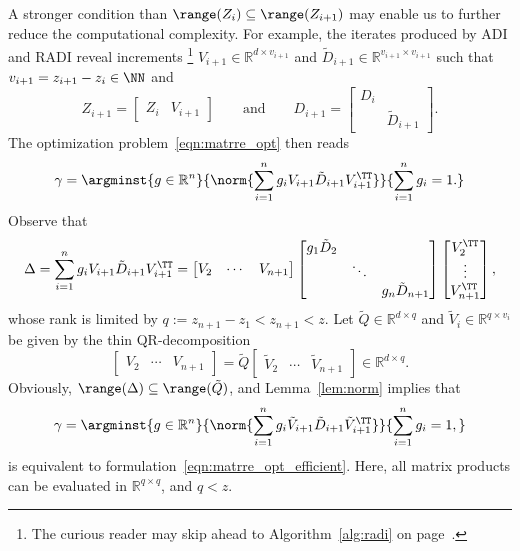 A stronger condition than $\range(Z_i)\subseteq\range(Z_{i+1})$ may enable us to further reduce the computational complexity.
For example, the iterates produced by \ac{ADI} and RADI reveal increments
\unskip\footnote{%
	The curious reader may skip ahead to Algorithm~\ref{alg:radi} on page~\pageref{alg:radi}.
}
$V_{i+1}\in\mathbb{R}^{d\times v_{i+1}}$ and
$\tilde{D}_{i+1}\in\mathbb{R}^{v_{i+1}\times v_{i+1}}$ such that
$v_{i+1} = z_{i+1}-z_i \in\NN$ and
\begin{equation}
	Z_{i+1} = \begin{bmatrix}
		Z_i & V_{i+1}
	\end{bmatrix}
	\qquad\text{and}\qquad
	D_{i+1} = \begin{bmatrix}
		D_i \\
		& \tilde D_{i+1}
	\end{bmatrix}
	.
	\label{eqn:Xi_lr_decomp_inc}
\end{equation}
The optimization problem~\eqref{eqn:matrre_opt} then reads
\begin{equation}
	\gamma = \argminst{%
		g\in\mathbb R^n
	}{%
		\norm{ \sum_{i=1}^{n} g_i V_{i+1} \tilde D_{i+1} V_{i+1}^\TT }
	}{%
		\sum_{i=1}^{n} g_i = 1
		.
	}
	\label{eqn:matrre_opt_more_efficient:interim}
\end{equation}
Observe that
\begin{equation}
	\Delta
	= \sum_{i=1}^{n} g_i V_{i+1} \tilde D_{i+1} V_{i+1}^\TT
	= \begin{bmatrix}
		V_2 & \cdots & V_{n+1}
	\end{bmatrix}
	\begin{bmatrix}
		g_1 \tilde D_2 \\
		& \ddots \\
		&& g_n \tilde D_{n+1}
	\end{bmatrix}
	\begin{bmatrix}
		V_2^\TT \\
		\vdots \\
		V_{n+1}^\TT
	\end{bmatrix}
	,
\end{equation}
whose rank is limited by $q := z_{n+1} - z_1 < z_{n+1} < z$.
Let $\tilde Q\in\mathbb{R}^{d\times q}$ and $\tilde V_i\in\mathbb{R}^{q\times v_i}$ be given by the thin QR-decomposition
\begin{equation}
	\begin{bmatrix}
		V_2 & \cdots & V_{n+1}
	\end{bmatrix} =
	\tilde Q \begin{bmatrix}
		\tilde V_2 & \cdots & \tilde V_{n+1}
	\end{bmatrix}
	\in\mathbb{R}^{d\times q}
	.
\end{equation}
Obviously, $\range(\Delta)\subseteq\range(\tilde Q)$,
and Lemma~\ref{lem:norm} implies that
\begin{equation}
	\gamma = \argminst{%
		g\in\mathbb R^n
	}{%
		\norm{ \sum_{i=1}^{n} g_i \tilde V_{i+1} \tilde D_{i+1} \tilde V_{i+1}^\TT }
	}{%
		\sum_{i=1}^{n} g_i = 1
		,
	}
	\label{eqn:matrre_opt_more_efficient}
\end{equation}
is equivalent to formulation~\eqref{eqn:matrre_opt_efficient}.
Here, all matrix products can be evaluated in $\mathbb{R}^{q\times q}$, and $q<z$.

